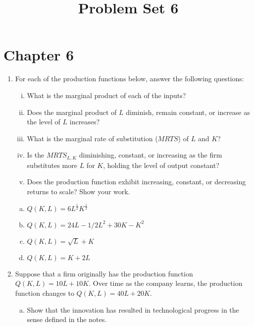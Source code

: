 \documentclass[11pt]{article}
\title{Problem Set 6}
\begin{document}
  
\section*{Chapter 6}

\begin{enumerate}
  \item For each of the production functions below, answer the following questions:
  \begin{enumerate}[(i)]
    \item What is the marginal product of each of the inputs?
    
    \item Does the marginal product of $L$ diminish, remain constant, or increase as the level of $L$ increases?
    
    \item What is the marginal rate of substitution ($MRTS$) of $L$ and $K$?
    
    \item Is the $MRTS_{L,K}$ diminishing, constant, or increasing as the firm substitutes more $L$ for $K$, holding the level of output constant?
    
    \item Does the production function exhibit increasing, constant, or decreasing returns to scale? Show your work.
  \end{enumerate}

  \begin{enumerate}[(a)]
    \item $Q(K, L) = 6 L^{\frac{1}{2}} K^{\frac{1}{2}}$
      
    \vspace*{70mm}
    \item $Q(K, L) = 24L - 1/2 L^2 + 30K - K^2$
    
    \vspace*{70mm}
    \item $Q(K, L) = \sqrt{L} + K$
    
    \vspace*{70mm}
    \item $Q(K, L) = K + 2L$
  \end{enumerate}

  \newpage
  \item Suppose that a firm originally has the production function $Q(K, L) = 10L + 10K$. Over time as the company learns, the production function changes to $Q(K, L) = 40L + 20K$.
  
  \begin{enumerate}[(a)]
    \item Show that the innovation has resulted in technological progress in the sense defined in the notes.
    

\end{enumerate}
\end{enumerate}
\end{document}

